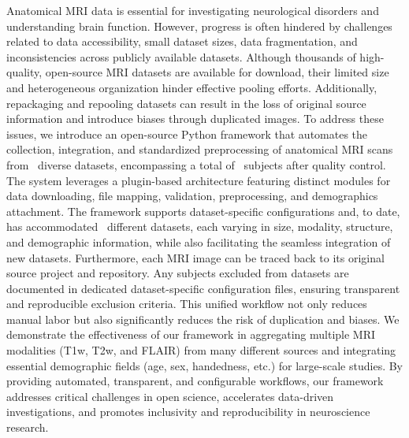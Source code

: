 Anatomical MRI data is essential for investigating neurological disorders and understanding brain function. 
However, progress is often hindered by challenges related to data accessibility, small dataset sizes, 
data fragmentation, and inconsistencies across publicly available datasets. Although thousands of high-quality, 
open-source MRI datasets are available for download, their limited size and heterogeneous organization hinder 
effective pooling efforts. Additionally, repackaging and repooling datasets can result in the loss of original 
source information and introduce biases through duplicated images. 
To address these issues, we introduce an open-source Python framework that automates the collection, integration, 
and standardized preprocessing of anatomical MRI scans from \NumDatasets\ diverse datasets, encompassing a total 
of \TotalSubjectsIncludedAfterInspectionCount\ subjects after quality control. The system leverages a plugin-based 
architecture featuring distinct modules for data downloading, file mapping, validation, preprocessing, and demographics 
attachment. The framework supports dataset-specific configurations and, to date, has accommodated \NumDatasets\ 
different datasets, each varying in size, modality, structure, and demographic information, while also facilitating 
the seamless integration of new datasets. Furthermore, each MRI image can be traced back to its original source project 
and repository. Any subjects excluded from datasets are documented in dedicated dataset-specific configuration files, ensuring transparent 
and reproducible exclusion criteria. This unified workflow not only reduces manual labor but also significantly reduces 
the risk of duplication and biases.
We demonstrate the effectiveness of our framework in aggregating multiple MRI modalities (T1w, T2w, and FLAIR) from 
many different sources and integrating essential demographic fields (age, sex, handedness, etc.) for large-scale 
studies. By providing automated, transparent, and configurable workflows, our framework addresses critical challenges 
in open science, accelerates data-driven investigations, and promotes inclusivity and reproducibility in neuroscience research.




